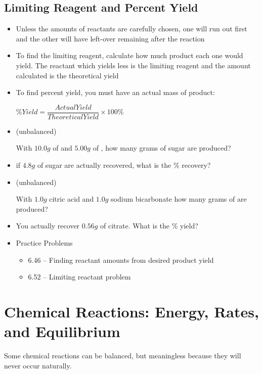\documentclass[12pt, openany, letterpaper]{memoir}
\begin{document}
\section{Limiting Reagent and Percent Yield}
\begin{itemize}
	\item Unless the amounts of reactants are carefully chosen, one will run out first and the other will have left-over remaining after the reaction
	\item To find the limiting reagent, calculate how much product each one would yield. The reactant which yields less is the limiting reagent and the amount calculated is the theoretical yield
	\item To find percent yield, you must have an actual mass of product:
	
	$\% Yield = \dfrac{Actual Yield}{Theoretical Yield}\times 100\%$
		\item {} (unbalanced)
	
	With $10.0g$ of  and $5.00g$ of , how many grams of sugar are produced?
	\item if $4.8g$ of sugar are actually recovered, what is the \% recovery?
	
	\item {} (unbalanced)
	
	With $1.0g$ citric acid and $1.0g$ sodium bicarbonate how many grams of  are produced?
	
	\item You actually recover $0.56g$ of citrate. What is the \% yield?
	\item Practice Problems
	\begin{itemize}
		\item 6.46 -- Finding reactant amounts from desired product yield 
		\item 6.52 -- Limiting reactant problem
	\end{itemize}
\end{itemize}

\chapter{Chemical Reactions: Energy, Rates, and Equilibrium}
Some chemical reactions can be balanced, but meaningless because they will never occur naturally.

\end{document}
